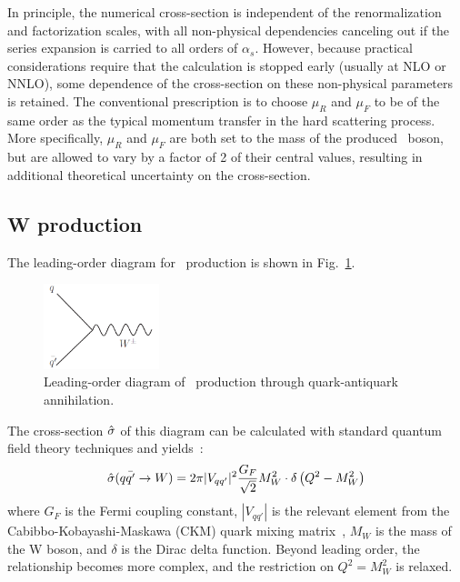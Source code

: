 In principle, the numerical cross-section is independent of the renormalization and factorization scales, with all non-physical dependencies canceling out if the series expansion is carried to all orders of $\alpha_{s}$. However, because practical considerations require that the calculation is stopped early (usually at NLO or NNLO), some dependence of the cross-section on these non-physical parameters is retained. The conventional prescription is to choose $\mu_{R}$ and $\mu_{F}$ to be of the same order as the typical momentum transfer in the hard scattering process. More specifically, $\mu_{R}$ and $\mu_{F}$ are both set to the mass of the produced \Wboson\ boson, but are allowed to vary by a factor of 2 of their central values, resulting in additional theoretical uncertainty on the cross-section.

\subsection{W production}

The leading-order diagram for \Wboson\ production is shown in Fig.~\ref{fig:theory:feynlo}.

\begin{figure}[phtb]
  \begin{center}
    \includegraphics[width=0.3\textwidth]{theory/fig/feynlo}
    \caption{ Leading-order diagram of \Wboson\ production through quark-antiquark annihilation.}
    \label{fig:theory:feynlo}
 \end{center}
\end{figure}

The cross-section $\hat{\sigma}$ of this diagram can be calculated with standard quantum field theory techniques and yields~\cite{PDG}:
$$ \hat{\sigma}(q\bar{q'} \rightarrow W) = 2\pi|V_{qq'}|^2 \frac{G_F}{\sqrt{2}} M_{W}^{2} \cdot \delta\left(Q^2 - M_{W}^{2}\right)$$
where $G_F$ is the Fermi coupling constant, $|V_{qq'}|$ is the relevant element from the Cabibbo-Kobayashi-Maskawa (CKM) quark mixing matrix~\cite{Kobayashi01021973}, $M_W$ is the mass of the W boson, and $\delta$ is the Dirac delta function. Beyond leading order, the relationship becomes more complex, and the restriction on $Q^2=M_{W}^{2}$ is relaxed.


